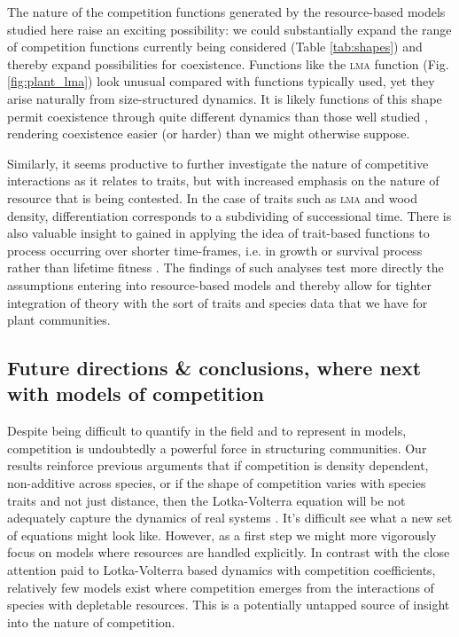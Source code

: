 \documentclass[a4paper,11pt]{article}
\begin{document}
The nature of the competition functions generated by the
resource-based models studied here raise an exciting possibility: we
could substantially expand the range of competition functions
currently being considered (Table \ref{tab:shapes}) and thereby expand
possibilities for coexistence. Functions like the \textsc {lma} function
(Fig. \ref{fig:plant_lma}) look unusual compared with functions
typically used, yet they arise naturally from size-structured
dynamics.  It is likely functions of this shape permit coexistence
through quite different dynamics than those well studied
\citep[e.g.][]{Leimar-2013}, rendering coexistence easier (or harder)
than we might otherwise suppose.

Similarly, it seems productive to further investigate the nature of
competitive interactions as it relates to traits, but with increased
emphasis on the nature of resource that is being contested. In the
case of traits such as \textsc{lma} and wood density, differentiation
corresponds to a subdividing of successional time. There is also
valuable insight to gained in applying the idea of trait-based functions
to process occurring over shorter time-frames, i.e. in growth or
survival process rather than lifetime fitness
\citep[e.g.][]{Kunstler-2012, Lasky-2015}.  The findings of such
analyses test more directly the assumptions entering into
resource-based models and thereby allow for tighter integration of
theory with the sort of traits and species data that we have for plant
communities.

\subsection{Future directions \& conclusions, where next with models of
competition}

Despite being difficult to quantify in the field and to represent in
models, competition is undoubtedly a powerful force in structuring
communities.
%
Our results reinforce previous arguments that if competition is
density dependent, non-additive across species, or if the shape of
competition varies with species traits and not just distance, then the
Lotka-Volterra equation will be not adequately capture the dynamics of
real systems \citep{Andrewartha-1953, Neill-1974, Abrams-1975,
  Wangersky-1978,Abrams-1980, Tilman-1987}.  It's difficult see what a
new set of equations might look like.  However, as a first step we
might more vigorously focus on models where resources are handled
explicitly.  In contrast with the close attention
paid to Lotka-Volterra based dynamics with competition coefficients,
relatively few models exist where competition emerges from the
interactions of species with depletable resources. This is a potentially
untapped source of insight into the nature of competition.
\end{document}
